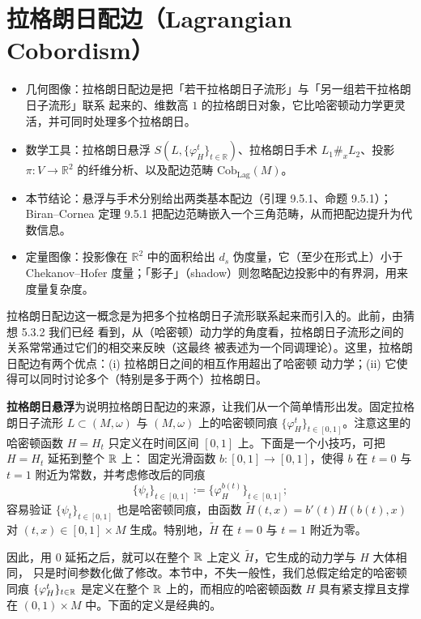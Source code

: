 \section{拉格朗日配边（Lagrangian Cobordism）}

\begin{keytakeaways}
\begin{itemize}
  \item 几何图像：拉格朗日配边是把「若干拉格朗日子流形」与「另一组若干拉格朗日子流形」联系
        起来的、维数高 $1$ 的拉格朗日对象，它比哈密顿动力学更灵活，并可同时处理多个拉格朗日。
  \item 数学工具：拉格朗日悬浮 $S(L,\{\varphi_H^t\}_{t\in\mathbb{R}})$、拉格朗日手术
        $L_1\#_xL_2$、投影 $\pi:V\to\mathbb{R}^2$ 的纤维分析、以及配边范畴
        $\mathrm{Cob}_{\mathrm{Lag}}(M)$。
  \item 本节结论：悬浮与手术分别给出两类基本配边（引理 9.5.1、命题 9.5.1）；
        Biran--Cornea 定理 9.5.1 把配边范畴嵌入一个三角范畴，从而把配边提升为代数信息。
  \item 定量图像：投影像在 $\mathbb{R}^2$ 中的面积给出 $d_s$ 伪度量，它（至少在形式上）小于
        Chekanov--Hofer 度量；「影子」（shadow）则忽略配边投影中的有界洞，用来度量复杂度。
\end{itemize}
\end{keytakeaways}

拉格朗日配边这一概念是为把多个拉格朗日子流形联系起来而引入的。此前，由猜想 5.3.2 我们已经
看到，从（哈密顿）动力学的角度看，拉格朗日子流形之间的关系常常通过它们的相交来反映（这最终
被表述为一个同调理论）。这里，拉格朗日配边有两个优点：(i) 拉格朗日之间的相互作用超出了哈密顿
动力学；(ii) 它使得可以同时讨论多个（特别是多于两个）拉格朗日。

\textbf{拉格朗日悬浮}\quad 为说明拉格朗日配边的来源，让我们从一个简单情形出发。固定拉格朗日子流形 $L\subset(M,\omega)$
与 $(M,\omega)$ 上的哈密顿同痕 $\{\varphi_H^t\}_{t\in[0,1]}$。注意这里的哈密顿函数
$H=H_t$ 只定义在时间区间 $[0,1]$ 上。下面是一个小技巧，可把 $H=H_t$ 延拓到整个 $\mathbb{R}$ 上：
固定光滑函数 $b:[0,1]\to[0,1]$，使得 $b$ 在 $t=0$ 与 $t=1$ 附近为常数，并考虑修改后的同痕
\[
  \{\psi_t\}_{t\in[0,1]}:=\{\varphi_H^{b(t)}\}_{t\in[0,1]};
\]
容易验证 $\{\psi_t\}_{t\in[0,1]}$ 也是哈密顿同痕，由函数
$\widetilde H(t,x)=b'(t)H(b(t),x)$ 对 $(t,x)\in[0,1]\times M$ 生成。特别地，$\widetilde H$
在 $t=0$ 与 $t=1$ 附近为零。

因此，用 $0$ 延拓之后，就可以在整个 $\mathbb{R}$ 上定义 $\widetilde H$，它生成的动力学与 $H$ 大体相同，
只是时间参数化做了修改。本节中，不失一般性，我们总假定给定的哈密顿同痕
$\{\varphi_H^t\}_{t\in\mathbb{R}}$ 是定义在整个 $\mathbb{R}$ 上的，而相应的哈密顿函数 $H$ 具有紧支撑且支撑在
$(0,1)\times M$ 中。下面的定义是经典的。

